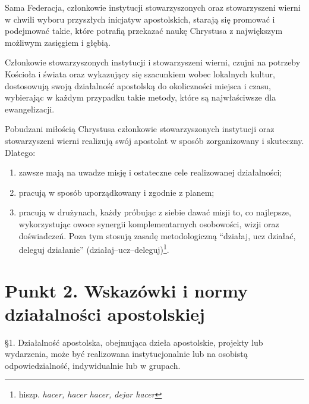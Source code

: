 

 Sama Federacja, członkowie instytucji stowarzyszonych oraz stowarzyszeni wierni w chwili wyboru przyszłych inicjatyw apostolskich, starają się promować i podejmować takie, które potrafią przekazać naukę Chrystusa z największym możliwym zasięgiem i głębią.
 


 Członkowie stowarzyszonych instytucji i stowarzyszeni wierni, czujni na potrzeby Kościoła i świata oraz wykazujący się szacunkiem wobec lokalnych kultur, dostosowują swoją działalność apostolską do okoliczności miejsca i czasu, wybierając w każdym przypadku takie metody, które są najwłaściwsze dla ewangelizacji.
 


 Pobudzani miłością Chrystusa członkowie stowarzyszonych instytucji oraz stowarzyszeni wierni realizują swój apostolat w sposób zorganizowany i skuteczny. Dlatego:


\begin{enumerate}


\item zawsze mają na uwadze misję i ostateczne cele realizowanej działalności;


\item pracują w sposób uporządkowany i zgodnie z planem;


\item pracują w drużynach, każdy próbując z siebie dawać misji to, co najlepsze, wykorzystując owoce synergii komplementarnych osobowości, wizji oraz doświadczeń. Poza tym stosują zasadę metodologiczną “działaj, ucz działać, deleguj działanie” (działaj--ucz--deleguj)\footnote{hiszp. {\em hacer, hacer hacer, dejar hacer}}.


\end{enumerate}




\section{Punkt 2. Wskazówki i normy działalności apostolskiej}


 
 \S{}1. Działalność apostolska, obejmująca dzieła apostolskie, projekty lub wydarzenia, może być realizowana instytucjonalnie lub na osobistą odpowiedzialność, indywidualnie lub w grupach.


